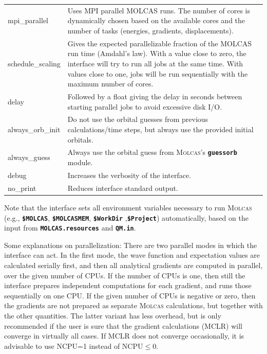 \documentclass[a4paper,10pt,DIV=15,openany]{scrbook}
\newcommand{\ttt}[1]{\textbf{\texttt{#1}}}
\begin{document}
\begin{table}
\begin{tabular}{>{\ttfamily}lp{12cm}}
mpi\_parallel   &Uses MPI parallel MOLCAS runs. The number of cores is dynamically chosen based on the available cores and the number of tasks (energies, gradients, displacements).\\
schedule\_scaling &Gives the expected parallelizable fraction of the MOLCAS run time (Amdahl's law). With a value close to zero, the interface will try to run all jobs at the same time. With values close to one, jobs will be run sequentially with the maximum number of cores.\\
delay           &Followed by a float giving the delay in seconds between starting parallel jobs to avoid excessive disk I/O.\\
always\_orb\_init &Do not use the orbital guesses from previous calculations/time steps, but always use the provided initial orbitals.\\
always\_guess   &Always use the orbital guess from \textsc{Molcas}'s \ttt{guessorb} module.\\
  debug           &Increases the verbosity of the interface.\\
  no\_print       &Reduces interface standard output.\\
  \hline
  \end{tabular}
\end{table}

Note that the interface sets all environment variables necessary to run \textsc{Molcas} (e.g., \ttt{\$MOLCAS}, \ttt{\$MOLCASMEM}, \ttt{\$WorkDir} ,\ttt{\$Project}) automatically, based on the input from \ttt{MOLCAS.resources} and \ttt{QM.in}.

Some explanations on parallelization: There are two parallel modes in which the interface can act. In the first mode, the wave function and expectation values are calculated serially first, and then all analytical gradients are computed in parallel, over the given number of CPUs. If the number of CPUs is one, then still the interface prepares independent computations for each gradient, and runs those sequentially on one CPU. If the given number of CPUs is negative or zero, then the gradients are not prepared as separate \textsc{Molcas} calculations, but together with the other quantities. The latter variant has less overhead, but is only recommended if the user is sure that the gradient calculations (MCLR) will converge in virtually all cases. If MCLR does not converge occasionally, it is advisable to use NCPU=1 instead of NCPU$\leq$0.
\end{document}
